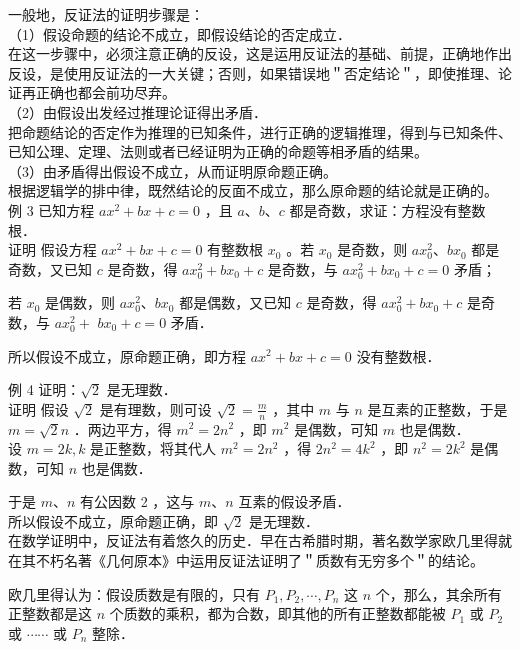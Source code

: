 \documentclass[10pt]{article}
\begin{document}
一般地，反证法的证明步骤是：\\
（1）假设命题的结论不成立，即假设结论的否定成立．\\
在这一步骤中，必须注意正确的反设，这是运用反证法的基础、前提，正确地作出反设，是使用反证法的一大关键；否则，如果错误地＂否定结论＂，即使推理、论证再正确也都会前功尽弃。\\
（2）由假设出发经过推理论证得出矛盾．\\
把命题结论的否定作为推理的已知条件，进行正确的逻辑推理，得到与已知条件、已知公理、定理、法则或者已经证明为正确的命题等相矛盾的结果。\\
（3）由矛盾得出假设不成立，从而证明原命题正确。\\
根据逻辑学的排中律，既然结论的反面不成立，那么原命题的结论就是正确的。\\
例 3 已知方程 \(a x^{2}+b x+c=0\) ，且 \(a 、 b 、 c\) 都是奇数，求证：方程没有整数根．\\
证明 假设方程 \(a x^{2}+b x+c=0\) 有整数根 \(x_{0}\) 。若 \(x_{0}\) 是奇数，则 \(a x_{0}^{2} 、 b x_{0}\) 都是奇数，又已知 \(c\) 是奇数，得 \(a x_{0}^{2}+b x_{0}+c\) 是奇数，与 \(a x_{0}^{2}+b x_{0}+c=0\) 矛盾；

若 \(x_{0}\) 是偶数，则 \(a x_{0}^{2} 、 b x_{0}\) 都是偶数，又已知 \(c\) 是奇数，得 \(a x_{0}^{2}+b x_{0}+c\) 是奇数，与 \(a x_{0}^{2}+\) \(b x_{0}+c=0\) 矛盾．

所以假设不成立，原命题正确，即方程 \(a x^{2}+b x+c=0\) 没有整数根．

例 4 证明：\(\sqrt{2}\) 是无理数．\\
证明 假设 \(\sqrt{2}\) 是有理数，则可设 \(\sqrt{2}=\frac{m}{n}\) ，其中 \(m\) 与 \(n\) 是互素的正整数，于是 \(m=\sqrt{2} n\) ．两边平方，得 \(m^{2}=2 n^{2}\) ，即 \(m^{2}\) 是偶数，可知 \(m\) 也是偶数．\\
设 \(m=2 k, k\) 是正整数，将其代人 \(m^{2}=2 n^{2}\) ，得 \(2 n^{2}=4 k^{2}\) ，即 \(n^{2}=2 k^{2}\) 是偶数，可知 \(n\) 也是偶数．

于是 \(m 、 n\) 有公因数 2 ，这与 \(m 、 n\) 互素的假设矛盾．\\
所以假设不成立，原命题正确，即 \(\sqrt{2}\) 是无理数．\\
在数学证明中，反证法有着悠久的历史．早在古希腊时期，著名数学家欧几里得就在其不朽名著《几何原本》中运用反证法证明了＂质数有无穷多个＂的结论。

欧几里得认为：假设质数是有限的，只有 \(P_{1}, P_{2}, \cdots, P_{n}\) 这 \(n\) 个，那么，其余所有正整数都是这 \(n\) 个质数的乘积，都为合数，即其他的所有正整数都能被 \(P_{1}\) 或 \(P_{2}\) 或 \(\cdots \cdots\) 或 \(P_{n}\) 整除．
\end{document}
